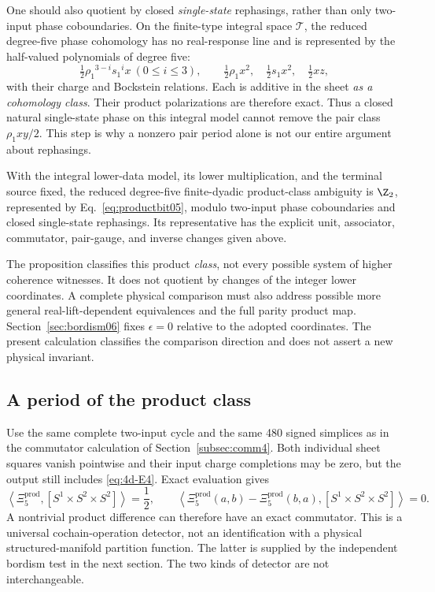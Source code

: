 One should also quotient by closed \emph{single-state} rephasings, rather than only two-input phase coboundaries. On the finite-type integral space $\mathcal T$, the reduced degree-five phase cohomology has no real-response line and is represented by the half-valued polynomials of degree five:
\begin{equation}
 \tfrac12{\rho_1}^{3-i}{s_1}^i x\ (0\leq i\leq3),\qquad
 \tfrac12{\rho_1} x^2,\quad\tfrac12{s_1} x^2,\quad\tfrac12xz,
\end{equation}
with their charge and Bockstein relations. Each is additive in the sheet \emph{as a cohomology class}. Their product polarizations are therefore exact. Thus a closed natural single-state phase on this integral model cannot remove the pair class ${\rho_1}xy/2$. This step is why a nonzero pair period alone is not our entire argument about rephasings.

\begin{proposition}\label{prop:productclass05}
With the integral lower-data model, its lower multiplication, and the terminal source fixed, the reduced degree-five finite-dyadic product-class ambiguity is $\Z_2$, represented by Eq.~\eqref{eq:productbit05}, modulo two-input phase coboundaries and closed single-state rephasings. Its representative has the explicit unit, associator, commutator, pair-gauge, and inverse changes given above.
\end{proposition}
The proposition classifies this product \emph{class}, not every possible system of higher coherence witnesses. It does not quotient by changes of the integer lower coordinates. A complete physical comparison must also address possible more general real-lift-dependent equivalences and the full parity product map. Section~\ref{sec:bordism06} fixes $\epsilon=0$ relative to the adopted coordinates. The present calculation classifies the comparison direction and does not assert a new physical invariant.



\subsection{A period of the product class}
Use the same complete two-input cycle and the same 480 signed simplices as in the commutator calculation of Section~\ref{subsec:comm4}. Both individual sheet squares vanish pointwise and their input charge completions may be zero, but the output still includes \eqref{eq:4d-E4}. Exact evaluation gives
\begin{equation}\label{eq:pairperiod05}
 \left\langle\Xi_5^{\mathrm{prod}},[S^1\times S^2\times S^2]\right\rangle=\frac12,
 \qquad
 \left\langle\Xi_5^{\mathrm{prod}}(a,b)-\Xi_5^{\mathrm{prod}}(b,a),[S^1\times S^2\times S^2]\right\rangle=0.
\end{equation}
A nontrivial product difference can therefore have an exact commutator. This is a universal cochain-operation detector, not an identification with a physical structured-manifold partition function. The latter is supplied by the independent bordism test in the next section. The two kinds of detector are not interchangeable.
